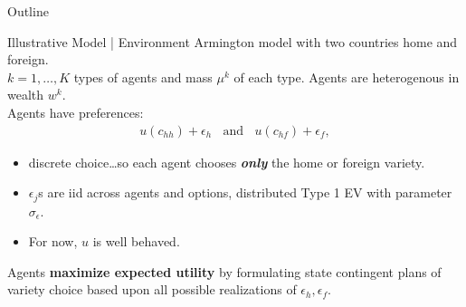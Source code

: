 \documentclass[9pt,pdftex,aspectratio=1610]{beamer}
\theoremstyle{definition}
\begin{document}
\begin{frame}[t]{Outline}
\smallskip
{}
\bigskip
{}
\end{frame}


\begin{frame}[t]{Illustrative Model | Environment}
\smallskip
Armington model with two countries home and foreign.\\
\medskip
$k = {1,\ldots, K}$ types of agents and mass $\mu^k$ of each type. Agents are heterogenous in wealth $w^k$.\\
\smallskip
Agents have preferences:
\begin{align*}
u(c_{hh}) + \epsilon_{h}  \ \ \ \  \mbox{and} \ \ \ \ u(c_{hf}) + \epsilon_{f},
\end{align*}
\begin{itemize}
\item discrete choice\ldots so each agent chooses \textbf{\emph{only}} the home or foreign variety.
\smallskip
\item $\epsilon_{j}$s are iid across agents and options, distributed Type 1 EV with parameter $\sigma_{\epsilon}$.
\smallskip
\item For now, $u$ is well behaved.
\end{itemize}
\medskip
Agents \textbf{maximize expected utility} by formulating state contingent plans of variety choice based upon all possible realizations of $\epsilon_h, \epsilon_f$.
\end{frame}

\end{document}

